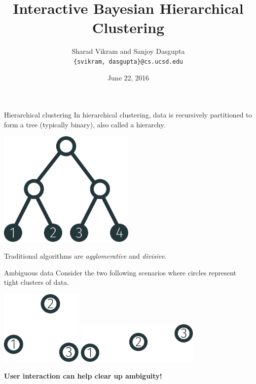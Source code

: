 \documentclass[10pt, compress]{beamer}
\title{Interactive Bayesian Hierarchical Clustering}
\subtitle{}
\date{June 22, 2016}
\author{Sharad Vikram and Sanjoy Dasgupta\\\texttt{\{svikram, dasgupta\}@cs.ucsd.edu}}
\institute{UCSD}
\begin{document}
\maketitle



\begin{frame}{Hierarchical clustering}
  In \alert{hierarchical clustering}, data
  is recursively partitioned to form a tree (typically binary),
  also called a hierarchy.

  \begin{center}
    \includegraphics[width=0.5\textwidth]{img/tree-1234-balanced}
  \end{center}

  \pause

Traditional algorithms are \emph{agglomerative}
and \emph{divisive}.

\end{frame}

\begin{frame}{Ambiguous data}
  Consider the two following scenarios where
  circles represent tight clusters of data.

  \begin{center}
    \includegraphics[width=0.3\textwidth]{img/3-cluster}\hfill
    \includegraphics[width=0.45\textwidth]{img/3-cluster-line}
  \end{center}

  \pause
  \textbf{User interaction can help clear up ambiguity!}

\end{frame}
\end{document}
